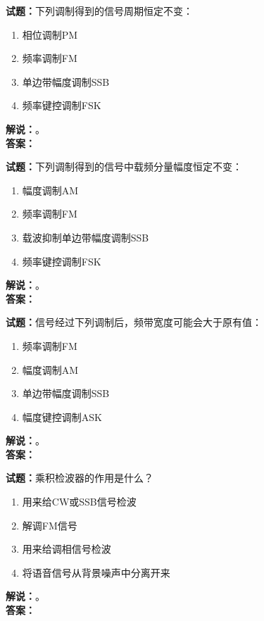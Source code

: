 \documentclass{ctexbook}
\begin{document}
\bigskip




\noindent\textbf{试题：}下列调制得到的信号周期恒定不变：
\begin{enumerate}[leftmargin=3em]
\item 相位调制PM
\item 频率调制FM
\item 单边带幅度调制SSB
\item 频率键控调制FSK
\end{enumerate}
\noindent\textbf{解说：}\textbf{}。\\\noindent\textbf{答案：}

\bigskip




\noindent\textbf{试题：}下列调制得到的信号中载频分量幅度恒定不变：
\begin{enumerate}[leftmargin=3em]
\item 幅度调制AM
\item 频率调制FM
\item 载波抑制单边带幅度调制SSB
\item 频率键控调制FSK
\end{enumerate}
\noindent\textbf{解说：}\textbf{}。\\\noindent\textbf{答案：}

\bigskip




\noindent\textbf{试题：}信号经过下列调制后，频带宽度可能会大于原有值：
\begin{enumerate}[leftmargin=3em]
\item 频率调制FM
\item 幅度调制AM
\item 单边带幅度调制SSB
\item 幅度键控调制ASK
\end{enumerate}
\noindent\textbf{解说：}\textbf{}。\\\noindent\textbf{答案：}

\bigskip




\noindent\textbf{试题：}乘积检波器的作用是什么？
\begin{enumerate}[leftmargin=3em]
\item 用来给CW或SSB信号检波
\item 解调FM信号
\item 用来给调相信号检波
\item 将语音信号从背景噪声中分离开来
\end{enumerate}
\noindent\textbf{解说：}\textbf{}。\\\noindent\textbf{答案：}
\end{document}
